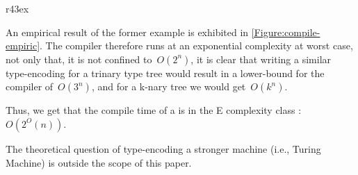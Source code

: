   
\begin{wrapfigure}r{43ex}%
  \caption{\label{Figure:compile-empiric} Compile time (sec) \emph{vs.} sequential method invocation length}%
\end{wrapfigure}%
  
An empirical result of the former example is exhibited in \cref{Figure:compile-empiric}.  
The \Java compiler therefore runs at an exponential complexity at worst case,
  not only that, it is not confined to~$O(2^n)$, it is clear that
  writing a similar type-encoding for a trinary type tree would result in
  a lower-bound for the \Java compiler of~$O(3^n)$, and for a k-nary tree
  we would get~$O(k^n)$.

Thus, we get that the compile time of a \Java is in the E complexity class :~$O(2^O(n))$.

The theoretical question of type-encoding a stronger machine (i.e., Turing Machine) 
  is outside the scope of this paper. 